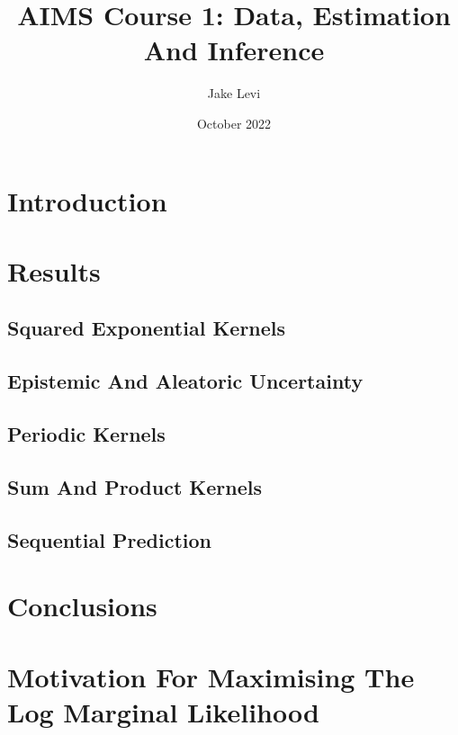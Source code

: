 \documentclass{article}
\title{AIMS Course 1: Data, Estimation And Inference}
\author{Jake Levi}
\date{October 2022}
\begin{document}
\maketitle
\section{Introduction} \label{section:intro}


\section{Results}
\subsection{Squared Exponential Kernels} \label{section:sqe}

\subsection{Epistemic And Aleatoric Uncertainty} \label{section:uncertainty}


\subsection{Periodic Kernels}


\subsection{Sum And Product Kernels}

\subsection{Sequential Prediction}


\section{Conclusions}



\appendix
\section{Motivation For Maximising The Log Marginal Likelihood}\label{appendix:why_lml}






\end{document}
